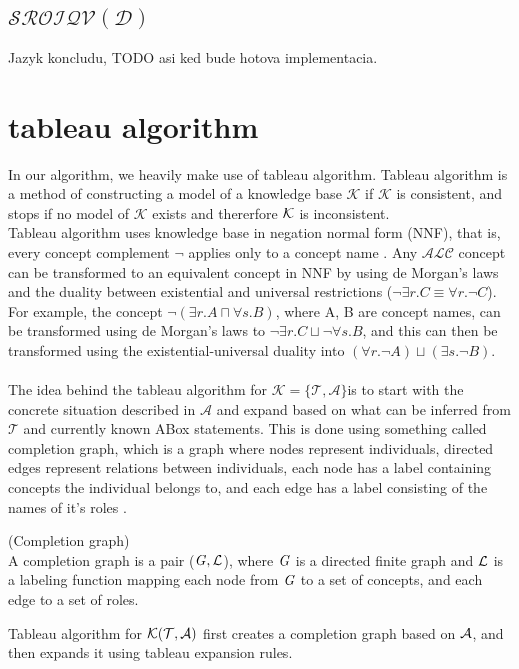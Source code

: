 \subsection{$\mathcal{SROIQV(D)}$}
Jazyk koncludu, TODO asi ked bude hotova implementacia.
\section{tableau algorithm}

In our algorithm, we heavily make use of tableau algorithm.
Tableau algorithm is a method of constructing a model of a knowledge base $\mathcal{K}$ if $\mathcal{K}$ is consistent, and stops if no model of $\mathcal{K}$ exists and thererfore $\mathcal{K}$ is inconsistent. \\ \indent
Tableau algorithm uses knowledge base in negation normal form (NNF), that is, every concept complement $\neg$ applies only to a concept name \cite{handbook2}.  Any $\mathcal{ALC}$ concept can be transformed to an equivalent concept in NNF by using de Morgan's laws and the duality between existential and universal restrictions ($\neg \exists r.C \equiv \forall r.{\neg C}$).
For example, the concept $\neg (\exists r.A \sqcap \forall s.B)$,
where A, B are concept names, can be transformed using de Morgan's laws to $\neg \exists r.C \sqcup \neg \forall s.B$, and this can then be transformed using the existential-universal duality into $(\forall r.\neg A) \sqcup (\exists s.\neg B)$.
\\ \\ 
\indent The idea behind the tableau algorithm for $\mathcal{K} = \{ \mathcal{T} , \mathcal{A} \} $is to start with the concrete situation described in $\mathcal{A}$ and expand based on what can be inferred from $\mathcal{T}$ and currently known ABox statements. This is done using something called completion graph, which is a graph where nodes represent individuals, directed edges represent relations between individuals, each node has a label containing concepts the individual belongs to, and each edge has a label consisting of the names of it's roles .

\begin{mydef} (Completion graph) \\
A completion graph is a pair ($\mathit{G},\mathcal{L}$), where $\mathit{G}$ is a directed finite graph and $\mathcal{L}$ is a labeling function mapping each node from $\mathit{G}$ to a set of concepts, and each edge to a set of roles. 
\end{mydef}


Tableau algorithm for $\mathcal{K} (\mathcal{T} ,\mathcal{A} )$ first creates a completion graph based on $\mathcal{A}$, and then expands it using tableau expansion rules.

